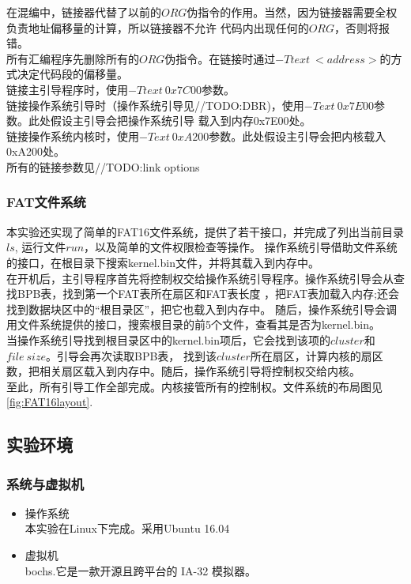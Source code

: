\documentclass[a4paper]{article}
\begin{document}
    在混编中，链接器代替了以前的$ORG$伪指令的作用。当然，因为链接器需要全权负责地址偏移量的计算，所以链接器不允许
    代码内出现任何的$ORG$，否则将报错。\\
    
    所有汇编程序先删除所有的$ORG$伪指令。在链接时通过$-Ttext\ <address>$的方式决定代码段的偏移量。\\
    
    链接主引导程序时，使用$-Ttext\ 0x7C00$参数。 \\

    链接操作系统引导时（操作系统引导见//TODO:DBR)，使用$-Text\ 0x7E00$参数。此处假设主引导会把操作系统引导
    载入到内存0x7E00处。\\ 
    
    链接操作系统内核时，使用$-Text\ 0xA200$参数。此处假设主引导会把内核载入0xA200处。\\ 

    所有的链接参数见//TODO:link options
    \subsubsection{FAT文件系统}\label{subsec:filesystem_intro}
    本实验还实现了简单的FAT16文件系统，提供了若干接口，并完成了列出当前目录$ls$, 运行文件$run$，以及简单的文件权限检查等操作。
    操作系统引导借助文件系统的接口，在根目录下搜索kernel.bin文件，并将其载入到内存中。\\
    
    在开机后，主引导程序首先将控制权交给操作系统引导程序。操作系统引导会从查找BPB表，找到第一个FAT表所在扇区和FAT表长度
    ，把FAT表加载入内存;还会找到数据块区中的``根目录区''，把它也载入到内存中。
    随后，操作系统引导会调用文件系统提供的接口，搜索根目录的前5个文件，查看其是否为kernel.bin。\\
    
    当操作系统引导找到根目录区中的kernel.bin项后，它会找到该项的$cluster$和$file\ size$。引导会再次读取BPB表，
    找到该$cluster$所在扇区，计算内核的扇区数，把相关扇区载入到内存中。随后，操作系统引导将控制权交给内核。\\
    
    至此，所有引导工作全部完成。内核接管所有的控制权。文件系统的布局图见\ref{fig:FAT16layout}.
    \subsection{实验环境}
    \subsubsection{系统与虚拟机}
    \begin{itemize} \item 操作系统 \\ 
        本实验在Linux下完成。采用Ubuntu 16.04
        \item 虚拟机\\
        bochs.它是一款开源且跨平台的 IA-32 模拟器。
    \end{itemize}
\end{document}
